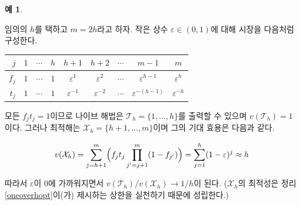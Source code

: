 \documentclass[11pt]{article} %
\newif\ifen
\theoremstyle{definition}
\newtheorem{example}{Example}
\theoremstyle{definition}
\newtheorem{example}{예}
\begin{document}
\begin{example} \label{tightexampleforoneoverhopt}
\ifen
Pick any $h$ and let $m = 2h$. For a small constant $\varepsilon \in (0, 1)$, define the market as follows.
\else
임의의 $h$를 택하고 $m = 2h$라고 하자. 작은 상수  $\varepsilon \in (0, 1)$에 대해 시장을 다음처럼 구성한다.
\fi
\begin{center}
\begin{tabular}{r|cccccccc}
$j$   & $1$      & $\cdots$ & $h$   &$h+1$         &  $h+2$ & $\cdots$ &      $m-1$  & $m$            \\ \hline
$f_j$ & $1$     &  $\cdots$ & $1$      & $\varepsilon^{1}$ & $\varepsilon^{2}$ & $\cdots$ & $\varepsilon^{h-1}$ & $\varepsilon^{h}$ \\
$t_j$ & $1$      &  $\cdots$ & $1$      & $\varepsilon^{-1}$ & $\varepsilon^{-2}$ & $\cdots$ & $\varepsilon^{-(h-1)}$ & $\varepsilon^{-h}$
\end{tabular}%
\end{center}
\ifen
Since all $f_j t_j = 1$, the na\"ive algorithm can choose $\mathcal{T}_h = \{1, \dots, h\}$, with $v(\mathcal{T}_h) = 1$. But the optimal solution is $\mathcal{X}_h = \{h+1, \dots, m\}$, with
\else
모든 $f_j t_j = 1$이므로 나이브 해법은 $\mathcal{T}_h = \{1, \dots, h\}$를 출력할 수 있으며 $v(\mathcal{T}_h) = 1$이다. 그러나 최적해는 $\mathcal{X}_h = \{h+1, \dots, m\}$이며 그의 기대 효용은 다음과 같다.
\fi
\begin{equation}
v(\mathcal{X}_h) = \sum_{j= h +1}^m \Bigl( f_j t_j \prod_{j' = j+1}^m (1 - f_{j'}) \Bigr) =  \sum_{j= 1}^h  (1 - \varepsilon)^{j} \approx h\ifen.\fi
\end{equation}
\ifen
Thus, as $\varepsilon$ approaches zero, we have $v(\mathcal{T}_h) / v(\mathcal{X}_h) \to 1/h$. (The optimality of $\mathcal{X}_h$ follows from the fact that it achieves the upper bound of Theorem \ref{oneoverhopt}.)
\else
따라서 $\varepsilon$이 0에 가까워지면서 $v(\mathcal{T}_h) / v(\mathcal{X}_h) \to 1/h$이 된다.  ($\mathcal{X}_h$의 최적성은 정리 \ref{oneoverhopt}이(가) 제시하는 상한을 실천하기 때문에 성립한다.)
\fi
\end{example}
\end{document}
